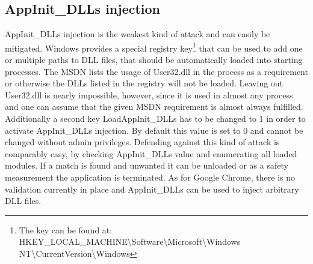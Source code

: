 \subsection{AppInit\_DLLs injection}
AppInit\_DLLs injection is the weakest kind of attack and can easily be mitigated. Windows provides a special registry key\footnote{The key can be found at: HKEY\_LOCAL\_MACHINE\textbackslash Software\textbackslash Microsoft\textbackslash Windows NT\textbackslash CurrentVersion\textbackslash Windows} that can be used to add one or multiple paths to DLL files, that should be automatically loaded into starting processes. The MSDN\cite{msdn_appinitdlls} lists the usage of User32.dll in the process as a requirement or otherwise the DLLs listed in the registry will not be loaded. Leaving out User32.dll is nearly impossible, however, since it is used in almost any process and one can assume that the given MSDN requirement is almost always fulfilled. Additionally a second key LoadAppInit\_DLLs has to be changed to 1 in order to activate AppInit\_DLLs injection. By default this value is set to 0 and cannot be changed without admin privileges. Defending against this kind of attack is comparably easy, by checking AppInit\_DLLs value and enumerating all loaded modules. If a match is found and unwanted it can be unloaded or as a safety measurement the application is terminated. As for Google Chrome, there is no validation currently in place and AppInit\_DLLs can be used to inject arbitrary DLL files.